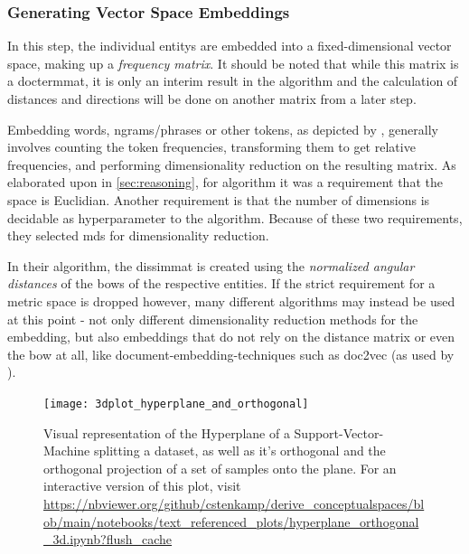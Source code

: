 \subsubsection{Generating Vector Space Embeddings}

\label{sec:generate_vectorspaces}

In this step, the individual \glspl{entity} are embedded into a fixed-dimensional vector space, making up a \emph{frequency matrix}. It should be noted that while this matrix is a \gls{doctermmat}, it is only an interim result in the algorithm and the calculation of distances and directions will be done on another matrix from a later step.

Embedding words, \glspl{ngram}/phrases or other tokens, as depicted by \cite{Turney2010,Lowe}, generally involves counting the token frequencies, transforming them to get relative frequencies, and performing dimensionality reduction on the resulting matrix. As elaborated upon in \autoref{sec:reasoning}, for  algorithm it was a requirement that the space is Euclidian. Another requirement is that the number of dimensions is decidable as hyperparameter to the algorithm. Because of these two requirements, they selected \gls{mds} for dimensionality reduction.

In their algorithm, the \gls{dissimmat} is created using the \emph{normalized angular distances} of the \glspl{bow} of the respective entities. If the strict requirement for a metric space is dropped however, many different algorithms may instead be used at this point - not only different dimensionality reduction methods for the embedding, but also embeddings that do not rely on the distance matrix or even the \gls{bow} at all, like document-embedding-techniques such as doc2vec \cite{Le2014} (as \eg used by \cite{Alshaikh2020}).






\begin{figure}[h!]
	\begin{center}
	  \texttt{[image: 3dplot\_hyperplane\_and\_orthogonal]}
	  \caption[Visual representation of the Hyperplane of an SVM splitting a dataset]{ \label{fig:3d_hyperplane_ortho} Visual representation of the Hyperplane of a Support-Vector-Machine splitting a dataset, as well as it's orthogonal and the orthogonal projection of a set of samples onto the plane. For an interactive version of this plot, visit  {\small \url{https://nbviewer.org/github/cstenkamp/derive_conceptualspaces/blob/main/notebooks/text_referenced_plots/hyperplane_orthogonal_3d.ipynb?flush_cache}}}
	\end{center}
\end{figure}


